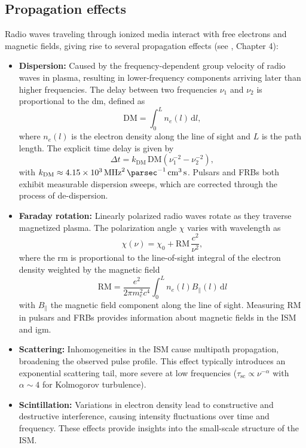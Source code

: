 \subsection{Propagation effects}

Radio waves traveling through ionized media interact with free electrons and magnetic fields, giving rise to several propagation effects (see \citealt{Lorimer2004}, Chapter 4):

\begin{itemize}
    \item \textbf{Dispersion:} Caused by the frequency-dependent group velocity of radio waves in plasma, resulting in lower-frequency components arriving later than higher frequencies. The delay between two frequencies $\nu_1$ and $\nu_2$ is proportional to the \gls{dm}, defined as
    \begin{equation}
        \mathrm{DM} = \int_0^L n_e(l) \, \mathrm{d}l ,
    \end{equation}
    where $n_e(l)$ is the electron density along the line of sight and $L$ is the path length. The explicit time delay is given by
	\begin{equation}
		\Delta t = k_{\text{DM}} \, \mathrm{DM} \left( \nu_1^{-2} - \nu_2^{-2} \right) ,
	\end{equation}
	with $k_{\text{DM}} \approx \SI{4.15e3}{\mega \hertz \squared \, \parsec^{-1} \, \centi \meter^{3} \, \second}$. Pulsars and FRBs both exhibit measurable dispersion sweeps, which are corrected through the process of de-dispersion.

	\item \textbf{Faraday rotation:} Linearly polarized radio waves rotate as they traverse magnetized plasma. The polarization angle $\chi$ varies with wavelength as
	\begin{equation}
		\chi(\nu) = \chi_0 + \mathrm{RM} \, \frac{c^2}{\nu^2} ,
		\end{equation}
    where the \gls{rm} is proportional to the line-of-sight integral of the electron density weighted by the magnetic field \citep{RM}
	\begin{equation}
		\mathrm{RM} = \frac{e^2}{2\pi m_e^2 c^4} \int_0^L n_e(l) B_\parallel(l) \, \mathrm{d}l 
	\end{equation}
	with $B_\parallel$ the magnetic field component along the line of sight. Measuring RM in pulsars and FRBs provides information about magnetic fields in the ISM and \gls{igm}.

    \item \textbf{Scattering:} Inhomogeneities in the ISM cause multipath propagation, broadening the observed pulse profile. This effect typically introduces an exponential scattering tail, more severe at low frequencies ($\tau_{\text{sc}} \propto \nu^{-\alpha}$ with $\alpha \sim 4$ for Kolmogorov turbulence).
    \item \textbf{Scintillation:} Variations in electron density lead to constructive and destructive interference, causing intensity fluctuations over time and frequency. These effects provide insights into the small-scale structure of the ISM.
\end{itemize}



